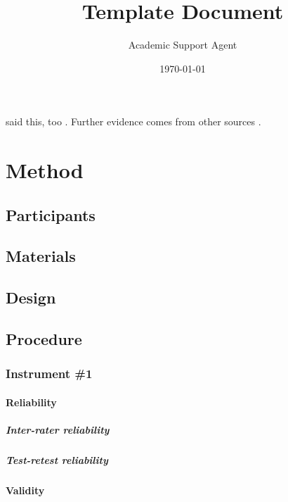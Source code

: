 \documentclass{article}
\title{Template Document}
\author{Academic Support Agent}
\date{\today}
\begin{document}
\maketitle

\maketitle
\lipsum[2]

\Textcite{vonDavier2011} said this,
too \parencite{vonDavier2011,Lassen2006}.  Further evidence comes from
other sources \parencite{Shotton1989,Lassen2006}.  \lipsum[3]

\section{Method}
\subsection{Participants}
\lipsum[4]

\subsection{Materials}
\lipsum[5]

\subsection{Design}
\lipsum[6]

\subsection{Procedure}
\lipsum[7]

\subsubsection{Instrument \#1}
\lipsum[8]

\paragraph{Reliability}
\lipsum[9]

\subparagraph{Inter-rater reliability}
\lipsum[10]

\subparagraph{Test-retest reliability}
\lipsum[11]

\paragraph{Validity}
\lipsum[12]
\end{document}

